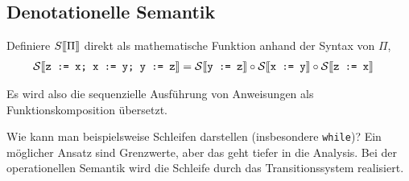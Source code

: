 \subsection{Denotationelle Semantik}

Definiere $S\mathrm{[}\kern-.14em\mathrm{[}\Pi\mathrm{]}\kern-.14em\mathrm{]}$ direkt als mathematische Funktion anhand der Syntax von $\Pi$, \zb{}
\begin{align*}
    \mathcal{S}\mathrm{[}\kern-.14em\mathrm{[}\texttt{z := x; x := y; y := z}\mathrm{]}\kern-.14em\mathrm{]} & = \mathcal{S}\mathrm{[}\kern-.14em\mathrm{[}\texttt{y := z}\mathrm{]}\kern-.14em\mathrm{]} \circ \mathcal{S}\mathrm{[}\kern-.14em\mathrm{[}\texttt{x := y}\mathrm{]}\kern-.14em\mathrm{]} \circ \mathcal{S}\mathrm{[}\kern-.14em\mathrm{[}\texttt{z := x}\mathrm{]}\kern-.14em\mathrm{]}
\end{align*}

Es wird also \zb{} die sequenzielle Ausführung von Anweisungen als Funktionskomposition übersetzt.

\begin{remark}[Problem]
    Wie kann man beispielsweise Schleifen darstellen (insbesondere \texttt{while})? Ein möglicher Ansatz sind Grenzwerte, aber das geht tiefer in die Analysis.
    Bei der operationellen Semantik wird die Schleife durch das Transitionssystem realisiert.
\end{remark}